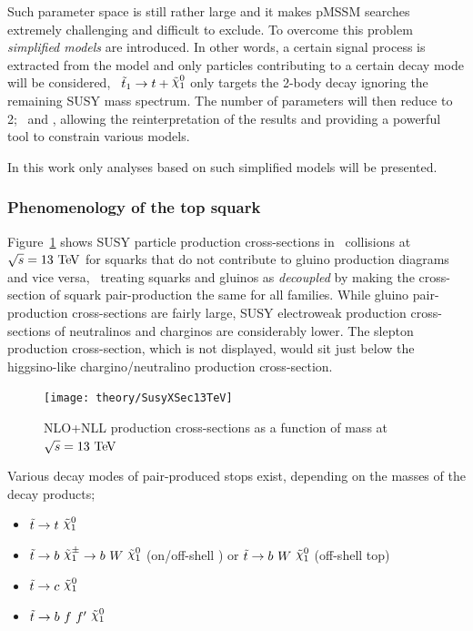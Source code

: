 				\noindent Such parameter space is still rather large and it makes \ac{pMSSM} searches extremely challenging and difficult to exclude. To overcome this problem \textit{simplified models} are introduced. In other words, a certain signal process is extracted from the model and only particles contributing to a certain decay mode will be considered, \eg\ $\stopone \ra t + \ninoone$ only targets the 2-body decay ignoring the remaining \ac{SUSY} mass spectrum. The number of parameters will then reduce to 2; \mstop\ and \mLSP, allowing the reinterpretation of the results and providing a powerful tool to constrain various models. 

				In this work only analyses based on such simplified models will be presented. 

			\subsubsection*{Phenomenology of the top squark}

				Figure~\ref{fig:susy_13TeV_xsec} shows \ac{SUSY} particle production cross-sections in \pp\ collisions at $\sqrt{s} = 13 \TeV$ for squarks that do not contribute to gluino production diagrams and vice versa, \ie\ treating squarks and gluinos as \textit{decoupled} by making the cross-section of squark pair-production the same for all families. While gluino pair-production cross-sections are fairly large, \ac{SUSY} electroweak production cross-sections of neutralinos and charginos are considerably lower. The slepton production cross-section, which is not displayed, would sit just below the higgsino-like chargino/neutralino production cross-section. 

				\begin{figure}[!htb]
					\centering
					\texttt{[image: theory/SusyXSec13TeV]}
					\caption{\label{fig:susy_13TeV_xsec} NLO+NLL production cross-sections as a function of mass at $\sqrt{s} = 13 \TeV$~\cite{Borschensky:2014cia}}
				\end{figure}

				Various decay modes of pair-produced stops exist, depending on the masses of the decay products; 

				\begin{itemize}
					\item $\stop \ra t\ \ninoone$
					\item $\stop \ra b\ \chinoonepm \ra b\  W\  \ninoone$ (on/off-shell \Wboson) or $\stop \ra b\  W\  \ninoone$ (off-shell top)
					\item $\stop \ra c\ \ninoone$
					\item $\stop \ra b\ f\ f'\ \ninoone$
				\end{itemize} 

